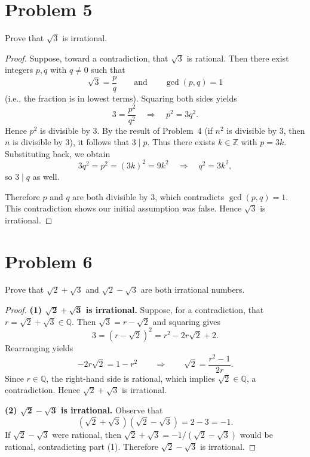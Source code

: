 \documentclass[12pt]{article}
\begin{document}
\section*{Problem 5}
Prove that $\sqrt{3}$ is irrational.

\begin{proof}
Suppose, toward a contradiction, that $\sqrt{3}$ is rational. Then there exist
integers $p,q$ with $q\neq 0$ such that
\[
\sqrt{3}=\frac{p}{q}\qquad\text{and}\qquad \gcd(p,q)=1
\]
(i.e., the fraction is in lowest terms). Squaring both sides yields
\[
3=\frac{p^2}{q^2}\quad\Longrightarrow\quad p^2=3q^2.
\]
Hence $p^2$ is divisible by $3$. By the result of Problem~4 (if $n^2$ is divisible
by $3$, then $n$ is divisible by $3$), it follows that $3\mid p$. Thus there exists
$k\in\mathbb Z$ with $p=3k$. Substituting back, we obtain
\[
3q^2=p^2=(3k)^2=9k^2 \quad\Longrightarrow\quad q^2=3k^2,
\]
so $3\mid q$ as well.

Therefore $p$ and $q$ are both divisible by $3$, which contradicts $\gcd(p,q)=1$.
This contradiction shows our initial assumption was false. Hence $\sqrt{3}$ is
irrational.
\end{proof}

\section*{Problem 6}
Prove that $\sqrt{2}+\sqrt{3}$ and $\sqrt{2}-\sqrt{3}$ are both irrational numbers.

\begin{proof}
\textbf{(1) $\boldsymbol{\sqrt{2}+\sqrt{3}}$ is irrational.}
Suppose, for a contradiction, that $r=\sqrt{2}+\sqrt{3}\in\mathbb{Q}$.
Then $\sqrt{3}=r-\sqrt{2}$ and squaring gives
\[
3=(r-\sqrt{2})^2=r^2-2r\sqrt{2}+2.
\]
Rearranging yields
\[
-2r\sqrt{2}=1-r^2 \qquad\Longrightarrow\qquad
\sqrt{2}=\frac{r^2-1}{2r}.
\]
Since $r\in\mathbb{Q}$, the right-hand side is rational, which implies
$\sqrt{2}\in\mathbb{Q}$, a contradiction. Hence $\sqrt{2}+\sqrt{3}$ is irrational.

\medskip
\textbf{(2) $\boldsymbol{\sqrt{2}-\sqrt{3}}$ is irrational.}
Observe that
\[
(\sqrt{2}+\sqrt{3})(\sqrt{2}-\sqrt{3})=2-3=-1.
\]
If $\sqrt{2}-\sqrt{3}$ were rational, then
\(
\sqrt{2}+\sqrt{3}=-1/(\sqrt{2}-\sqrt{3})
\)
would be rational, contradicting part (1).
Therefore $\sqrt{2}-\sqrt{3}$ is irrational.
\end{proof}
\end{document}
